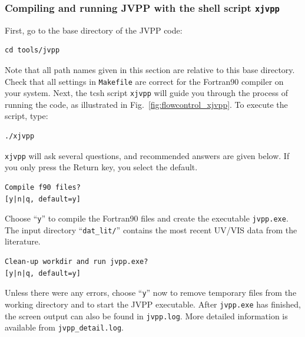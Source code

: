 \documentclass[a4paper,twoside]{article}
\newcommand{\IT}[1]{#1\index{#1}}
\begin{document}
\subsubsection{Compiling and running \IT{JVPP} with the shell script
  {\tt xjvpp}}

First, go to the base directory of the \IT{JVPP} code:
\begin{verbatim}
cd tools/jvpp
\end{verbatim}
Note that all path names given in this section are relative to this base
directory. Check that all settings in \verb|Makefile| are correct for
the Fortran90 compiler on your system. Next, the tcsh script
\verb|xjvpp| will guide you through the process of running the code, as
illustrated in Fig.~\ref{fig:flowcontrol_xjvpp}. To execute the script,
type:
\begin{verbatim}
./xjvpp
\end{verbatim}
\verb|xjvpp| will ask several questions, and recommended answers are
given below. If you only press the Return key, you select the default.
\begin{verbatim}
Compile f90 files?
[y|n|q, default=y]
\end{verbatim}
Choose ``\verb|y|'' to compile the Fortran90 files and create the
executable \verb|jvpp.exe|. The input directory ``\verb|dat_lit/|''
contains the most recent UV/VIS data from the literature.
\begin{verbatim}
Clean-up workdir and run jvpp.exe?
[y|n|q, default=y]
\end{verbatim}
Unless there were any errors, choose ``\verb|y|'' now to remove
temporary files from the working directory and to start the \IT{JVPP}
executable. After \verb|jvpp.exe| has finished, the screen output can
also be found in \verb|jvpp.log|. More detailed information is available
from \verb|jvpp_detail.log|.
\end{document}

